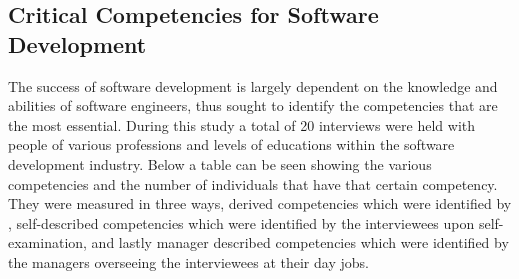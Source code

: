 \subsection{Critical Competencies for Software Development}
\par{The success of software development is largely dependent on the knowledge and abilities of software engineers, thus \cite{turley1994identifying} sought to identify the competencies that are the most essential. During this study a total of 20 interviews were held with people of various professions and levels of educations within the software development industry. Below a table can be seen showing the various competencies and the number of individuals that have that certain competency. They were measured in three ways, derived competencies which were identified by \cite{turley1994identifying}, self-described competencies which were identified by the interviewees upon self-examination, and lastly manager described competencies which were identified by the managers overseeing the interviewees at their day jobs.}
\pagebreak
